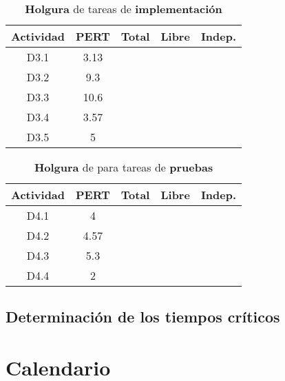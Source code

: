 \documentclass[11pt,a4paper,spanish,twoside]{report}
\begin{document}
\begin{table}[!h]
\centering
  \begin{tabular}{|c||c||c|c|c|}
    \hline
     \textbf{Actividad} & \textbf{PERT} & \textbf{Total} & \textbf{Libre}
    & \textbf{Indep.}\\
    \hline \hline
    D3.1 & 3.13 & & & \\
    \hline
    D3.2 & 9.3 & & & \\
    \hline
    D3.3 & 10.6 & & & \\
    \hline
    D3.4 & 3.57 & & & \\
    \hline
    D3.5 & 5 & & & \\
    \hline
  \end{tabular}
  \caption{\textbf{Holgura} de tareas de \textbf{implementación}}
  \label{Tab:hol3}
\end{table}

\begin{table}[!h]
\centering
  \begin{tabular}{|c||c||c|c|c|}
    \hline
     \textbf{Actividad} & \textbf{PERT} & \textbf{Total} & \textbf{Libre}
    & \textbf{Indep.}\\
    \hline \hline
    D4.1 & 4 & & & \\
    \hline
    D4.2 & 4.57 & & & \\
    \hline
    D4.3 & 5.3 & & & \\
    \hline
    D4.4 & 2 & & & \\
    \hline
  \end{tabular}
  \caption{\textbf{Holgura} de para tareas de \textbf{pruebas}}
  \label{Tab:hol4}
\end{table}

\section{Determinación de los tiempos críticos}

\chapter{Calendario}
\end{document}
